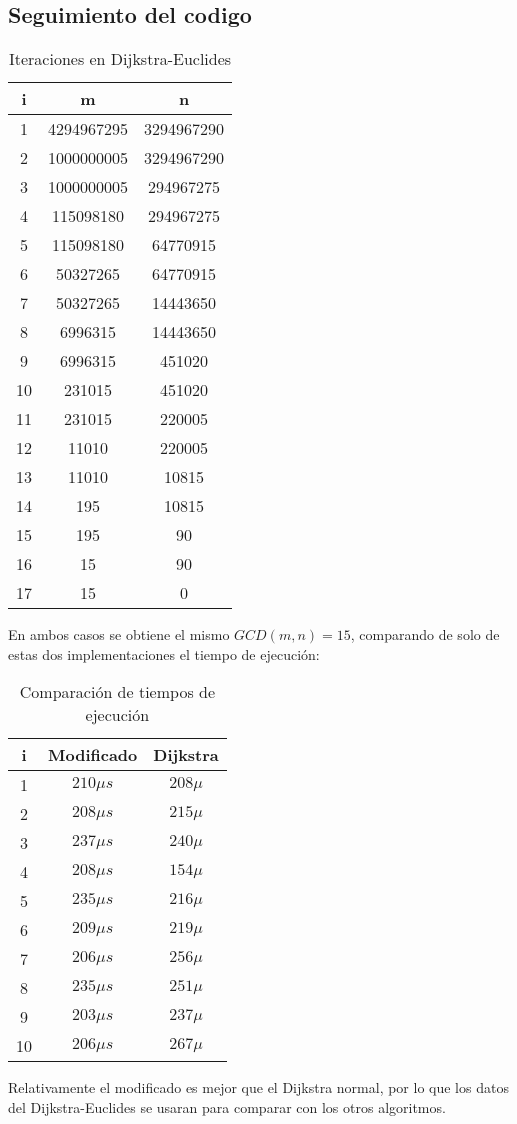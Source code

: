 \subsection{Seguimiento del codigo}
\begin{table}[!h]
\label{tablax}
\begin{center}
\begin{tabular}{|c|c|c|}
\hline 
i&m&n \\
\hline
1&4294967295&3294967290\\\hline
2&1000000005&3294967290\\\hline
3&1000000005&294967275\\\hline
4&115098180&294967275\\\hline
5&115098180&64770915\\\hline
6&50327265&64770915\\\hline
7&50327265&14443650\\\hline
8&6996315&14443650\\\hline
9&6996315&451020\\\hline
10&231015&451020\\\hline
11&231015&220005\\\hline
12&11010&220005\\\hline
13&11010&10815\\\hline
14&195&10815\\\hline
15&195&90\\\hline
16&15&90\\\hline
17&15&0\\\hline
\end{tabular}
\end{center}
\caption{Iteraciones en Dijkstra-Euclides}
\end{table}
En ambos casos se obtiene el mismo $GCD(m,n)=15$, comparando de solo de estas dos implementaciones el tiempo de ejecuci\'on:
\begin{table}[!h]
\label{tablax}
\begin{center}
\begin{tabular}{|c|c|c|}
\hline 
i&Modificado&Dijkstra \\
\hline
1&$210\mu s$&$208\mu$ \\ \hline
2&$208\mu s$&$215\mu$ \\ \hline
3&$237\mu s$&$240\mu$ \\ \hline
4&$208\mu s$&$154\mu$ \\ \hline
5&$235\mu s$&$216\mu$ \\ \hline
6&$209\mu s$&$219\mu$ \\ \hline
7&$206\mu s$&$256\mu$ \\ \hline
8&$235\mu s$&$251\mu$ \\ \hline
9&$203\mu s$&$237\mu$ \\ \hline
10&$206\mu s$&$267\mu$ \\ \hline
\end{tabular}
\end{center}
\caption{Comparaci\'on de tiempos de ejecuci\'on}
\end{table}
Relativamente el modificado es mejor que el Dijkstra normal, por lo que los datos del Dijkstra-Euclides se usaran para comparar con los otros algoritmos.